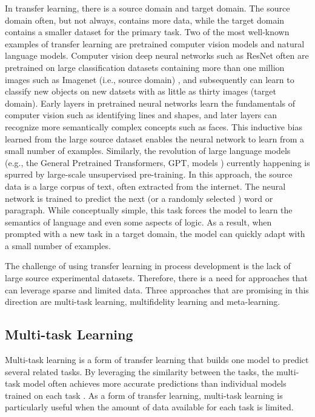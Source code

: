 In transfer learning, there is a source domain and target domain. The source domain often, but not always, contains more data, while the target domain contains a smaller dataset for the primary task. Two of the most well-known examples of transfer learning are pretrained computer vision models and natural language models. Computer vision deep neural networks such as ResNet \cite{He2016} often are pretrained on large classification datasets containing more than one million images such as Imagenet (i.e., source domain) \cite{Russakovsky2015}, and subsequently can learn to classify new objects on new datsets with as little as thirty images (target domain). Early layers in pretrained neural networks learn the fundamentals of computer vision such as identifying lines and shapes, and later layers can recognize more semantically complex concepts such as faces. This inductive bias learned from the large source dataset enables the neural network to learn from a small number of examples.  Similarly, the revolution of large language models (e.g., the General Pretrained Transformers, GPT, models \cite{Radford2018, Brown2020}) currently happening is spurred by large-scale unsupervised pre-training. In this approach, the source data is a large corpus of text, often extracted from the internet. The neural network is trained to predict the next (or a randomly selected \cite{Delvin2019}) word or paragraph. While conceptually simple, this task forces the model to learn the semantics of language and even some aspects of logic. As a result, when prompted with a new task in a target domain, the model can quickly adapt with a small number of examples.

The challenge of using transfer learning in process development is the lack of large source experimental datasets. Therefore, there is a need for approaches that can leverage sparse and limited data. Three approaches that are promising in this direction are multi-task learning, multifidelity learning and meta-learning.

\subsection{Multi-task Learning}

Multi-task learning is a form of transfer learning that builds one model to predict several related tasks. By leveraging the similarity between the tasks, the multi-task model often achieves more accurate predictions than individual models trained on each task \cite{Simes2018}. As a form of transfer learning, multi-task learning is particularly useful when the amount of data available for each task is limited.

